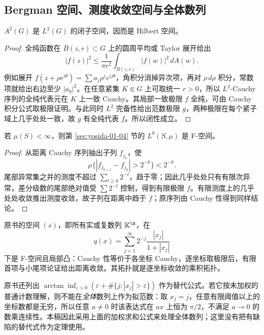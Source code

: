 \subsection{Bergman 空间、测度收敛空间与全体数列}
\begin{proposition}
$A^2(G)$ 是 $L^2(G)$ 的闭子空间，因而是 Hilbert 空间。
\end{proposition}
\begin{proof}
全纯函数在 $\overline B(z,r)\subset G$ 上的圆周平均或 Taylor 展开给出
\[
 |f(z)|^2\le\frac1{\pi r^2}\int_{B(z,r)}|f(w)|^2\,dA(w).
\]
例如展开 $f(z+\rho e^{i\theta})=\sum a_j\rho^je^{ij\theta}$，角积分消掉异次项，再对 $\rho\,d\rho$ 积分，常数项就给出右边至少 $|a_0|^2$。在任意紧集 $K\Subset G$ 上可取统一 $r>0$，所以 $L^2$-Cauchy 序列的全纯代表元在 $K$ 上一致 Cauchy。其局部一致极限 $f$ 全纯，可由 Cauchy 积分公式取极限证明。与此同时 $L^2$ 完备性给出范数极限 $g$，两种极限在每个紧子域上几乎处处一致，故 $g$ 有全纯代表 $f$。所以闭性成立。
\end{proof}

\begin{proposition}[测度收敛空间完备]
若 $\mu(S)<\infty$，则第 \ref{sec:yosida-01-04} 节的 $L^0(S,\mu)$ 是 F-空间。
\end{proposition}
\begin{proof}
从距离 Cauchy 序列抽出子列 $f_{j_k}$，使
\[
 \mu\{|f_{j_{k+1}}-f_{j_k}|>2^{-k}\}<2^{-k}.
\]
尾部异常集之并的测度不超过 $\sum_{l\ge k}2^{-l}$，趋于零；因此几乎处处只有有限次异常，差分级数的尾部绝对值受 $\sum2^{-l}$ 控制，得到有限极限 $f$。有限测度上的几乎处处收敛推出测度收敛，故子列在距离中趋于 $f$；原序列由 Cauchy 性得到同样结论。
\end{proof}
原书的空间 $(s)$，即所有实或复数列 $\mathbb K^{\N}$，在
\[
 q(x)=\sum_{j=1}^\infty2^{-j}\frac{|x_j|}{1+|x_j|}
\]
下是 F-空间且局部凸：Cauchy 性等价于各坐标 Cauchy，逐坐标取极限后，有限首项与小尾项论证给出距离收敛。其拓扑就是逐坐标收敛的乘积拓扑。
\begin{pitfall}
原书还列出 $\arctan\inf_{\varepsilon>0}(\varepsilon+\#\{j:|x_j|>\varepsilon\})$ 作为替代公式。若它按未加权的普通计数理解，则不能在\emph{全体}数列上作为拟范数：取 $x_j=j$，任意有限阈值以上的坐标数都是无穷，所以任意 $a\ne0$ 时该表达式在 $ax$ 上恒为 $\pi/2$，不满足 $a\to0$ 的数乘连续性。本稿因此采用上面的加权求和公式来处理全体数列；这里没有把有缺陷的替代式作为定理使用。
\end{pitfall}

